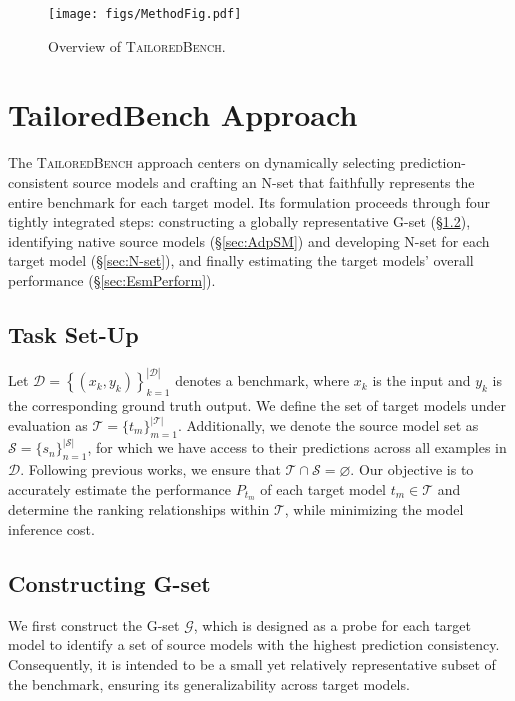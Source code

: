 \begin{figure*}[ht]
    \centering
    \texttt{[image: figs/MethodFig.pdf]}
    \vspace{-0.1cm}
    \caption{Overview of \textsc{TailoredBench}.}
    \label{FigMethod}
    \vspace{-0.4cm}
\end{figure*}
\section{TailoredBench Approach}

The \textsc{TailoredBench} approach centers on dynamically selecting prediction-consistent source models and crafting an N-set that faithfully represents the entire benchmark for each target model.
Its formulation proceeds through four tightly integrated steps: constructing a globally representative G-set (\S\ref{sec:G-set}), identifying native source models (\S\ref{sec:AdpSM}) and developing N-set for each target model (\S\ref{sec:N-set}), and finally estimating the target models' overall performance (\S\ref{sec:EsmPerform}).

\subsection{Task Set-Up}
Let $\mathcal{D} = \left\{(x_{k}, y_{k})\right\}_{k=1}^{|\mathcal{D}|}$ denotes a benchmark, where $x_{k}$ is the input and $y_{k}$ is the corresponding ground truth output. We define the set of target models under evaluation as $\mathcal{T} = \{ t_{m} \}_{m=1}^{|\mathcal{T}|}$. Additionally, we denote the source model set as $\mathcal{S} = \{ s_{n} \}_{n=1}^{|\mathcal{S}|}$, for which we have access to their predictions across all examples in $\mathcal{D}$. Following previous works, we ensure that $\mathcal{T} \cap \mathcal{S} = \varnothing$. Our objective is to accurately estimate the performance $P_{t_m}$ of each target model $t_m \in \mathcal{T}$ and determine the ranking relationships within $\mathcal{T}$, while minimizing the model inference cost.

\subsection{Constructing G-set}
\label{sec:G-set}
We first construct the G-set $\mathcal{G}$, which is designed as a probe for each target model to identify a set of source models with the highest prediction consistency. 
Consequently, it is intended to be a small yet relatively representative subset of the benchmark, ensuring its generalizability across target models. 

